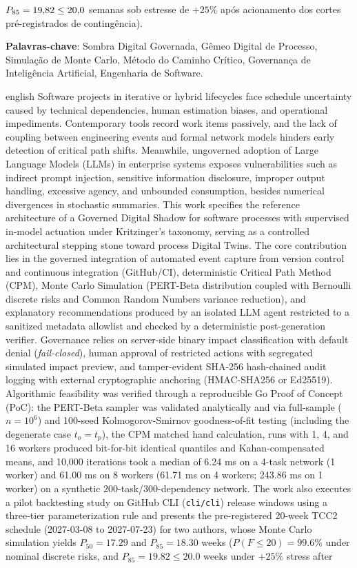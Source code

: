 \documentclass[12pt,openany,oneside,a4paper,english,brazilian,sumario=tradicional]{abntex2}
\begin{document}
\begin{resumo}
$P_{85}=19{,}82{} \le 20{,}0$ semanas sob estresse de $+25\%$ após acionamento dos cortes pré-registrados de contingência).

\textbf{Palavras-chave}: Sombra Digital Governada, Gêmeo Digital de Processo, Simulação de Monte Carlo, Método do Caminho Crítico, Governança de Inteligência Artificial, Engenharia de Software.
\end{resumo}

\begin{resumo}[Abstract]
\begin{otherlanguage*}{english}
Software projects in iterative or hybrid lifecycles face schedule uncertainty caused by technical dependencies, human estimation biases, and operational impediments. Contemporary tools record work items passively, and the lack of coupling between engineering events and formal network models hinders early detection of critical path shifts. Meanwhile, ungoverned adoption of Large Language Models (LLMs) in enterprise systems exposes vulnerabilities such as indirect prompt injection, sensitive information disclosure, improper output handling, excessive agency, and unbounded consumption, besides numerical divergences in stochastic summaries. This work specifies the reference architecture of a Governed Digital Shadow for software processes with supervised in-model actuation under Kritzinger's taxonomy, serving as a controlled architectural stepping stone toward process Digital Twins. The core contribution lies in the governed integration of automated event capture from version control and continuous integration (GitHub/CI), deterministic Critical Path Method (CPM), Monte Carlo Simulation (PERT-Beta distribution coupled with Bernoulli discrete risks and Common Random Numbers variance reduction), and explanatory recommendations produced by an isolated LLM agent restricted to a sanitized metadata allowlist and checked by a deterministic post-generation verifier. Governance relies on server-side binary impact classification with default denial (\textit{fail-closed}), human approval of restricted actions with segregated simulated impact preview, and tamper-evident SHA-256 hash-chained audit logging with external cryptographic anchoring (HMAC-SHA256 or Ed25519). Algorithmic feasibility was verified through a reproducible Go Proof of Concept (PoC): the PERT-Beta sampler was validated analytically and via full-sample ($n=10^6$) and 100-seed Kolmogorov-Smirnov goodness-of-fit testing (including the degenerate case $t_o=t_p$), the CPM matched hand calculation, runs with 1, 4, and 16 workers produced bit-for-bit identical quantiles and Kahan-compensated means, and 10,000 iterations took a median of 6.24 ms on a 4-task network (1 worker) and 61.00 ms on 8 workers (61.71 ms on 4 workers; 243.86 ms on 1 worker) on a synthetic 200-task/300-dependency network. The work also executes a pilot backtesting study on GitHub CLI (\texttt{cli/cli}) release windows using a three-tier parameterization rule and presents the pre-registered 20-week TCC2 schedule (2027-03-08 to 2027-07-23) for two authors, whose Monte Carlo simulation yields $P_{50}=17.29$ and $P_{85}=18.30$ weeks ($P(F \le 20)=99.6\%$ under nominal discrete risks, and $P_{85}=19.82 \le 20.0$ weeks under $+25\%$ stress after 
\end{otherlanguage*}
\end{resumo}
\end{document}
